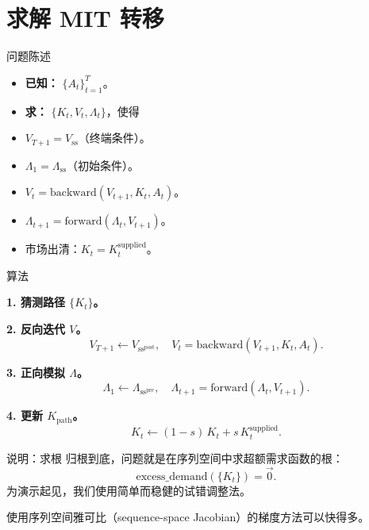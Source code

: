 \documentclass[10pt,aspectratio=169]{beamer}
\begin{document}
\section[求解 MIT 转移]{求解 MIT 转移}

\begin{frame}{问题陈述}
  \begin{itemize}
    \item \textbf{已知：} $\{A_t\}_{t = 1}^T$。
    \item \textbf{求：} $\{K_t, V_t, \Lambda_t\}$，使得
  \end{itemize}
  \begin{itemize}
    \item $V_{T+1} = V_{\mathrm{ss}}$（终端条件）。
    \item $\Lambda_1 = \Lambda_{\mathrm{ss}}$（初始条件）。
    \item $V_t = \text{backward}(V_{t+1}, K_t, A_t)$。
    \item $\Lambda_{t+1} = \text{forward}(\Lambda_t, V_{t+1})$。
    \item 市场出清：$K_t = K_t^{\mathrm{supplied}}$。
  \end{itemize}
\end{frame}

\begin{frame}{算法}

\textbf{1. 猜测路径 $\{K_t\}$。}

\textbf{2. 反向迭代 $V$。}
\[
  V_{T+1} \leftarrow V_{\mathrm{ss}^{\mathrm{post}}}, \quad V_t = \text{backward}(V_{t+1}, K_t, A_t).
\]

\textbf{3. 正向模拟 $\Lambda$。}
\[
  \Lambda_1 \leftarrow \Lambda_{\mathrm{ss}^{\mathrm{pre}}}, \quad \Lambda_{t+1} = \text{forward}(\Lambda_t, V_{t+1}).
\]

\textbf{4. 更新 $K_{\mathrm{path}}$。}
\[
  K_t \leftarrow (1 - s)\,K_t + s\,K_t^{\mathrm{supplied}}.
\]

\end{frame}

\begin{frame}{说明：求根}
  归根到底，问题就是在序列空间中求超额需求函数的根：
  \[
    \text{excess\_demand}(\{K_t\}) = \vec{0}.
  \]
  为演示起见，我们使用简单而稳健的试错调整法。

  使用序列空间雅可比（sequence-space Jacobian）的梯度方法可以快得多。
\end{frame}
\end{document}
